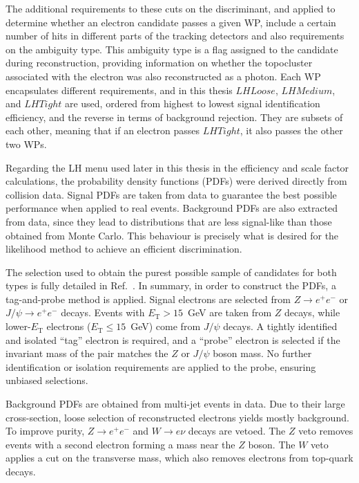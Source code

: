 The additional requirements to these cuts on the discriminant, and applied to determine whether an electron candidate passes a given WP, include a certain number of hits in different parts of the tracking detectors and also requirements on the ambiguity type. This ambiguity type is a flag assigned to the candidate during reconstruction, providing information on whether the topocluster associated with the electron was also reconstructed as a photon.
Each WP encapsulates different requirements, and in this thesis $LHLoose$, $LHMedium$, and $LHTight$ are used, ordered from highest to lowest signal identification efficiency, and the reverse in terms of background rejection. They are subsets of each other, meaning that if an electron passes $LHTight$, it also passes the other two WPs.

Regarding the LH menu used later in this thesis in the efficiency and scale factor calculations, the probability density functions (PDFs) were derived directly from collision data. Signal PDFs are taken from data to guarantee the best possible performance when applied to real events. Background PDFs are also extracted from data, since they lead to distributions that are less signal-like than those obtained from Monte Carlo. This behaviour is precisely what is desired for the likelihood method to achieve an efficient discrimination.

The selection used to obtain the purest possible sample of candidates for both types is fully detailed in Ref.~\cite{lucas_thesis}. In summary, in order to construct the PDFs, a tag-and-probe method is applied. Signal electrons are selected from $Z \rightarrow e^{+}e^{-}$ or $J/\psi \rightarrow e^{+}e^{-}$ decays. Events with $E_{\text{T}} > 15$~GeV are taken from $Z$ decays, while lower-$E_{\text{T}}$ electrons ($E_{\text{T}} \leq 15$~GeV) come from $J/\psi$ decays. A tightly identified and isolated “tag” electron is required, and a “probe” electron is selected if the invariant mass of the pair matches the $Z$ or $J/\psi$ boson mass. No further identification or isolation requirements are applied to the probe, ensuring unbiased selections.

Background PDFs are obtained from multi-jet events in data. Due to their large cross-section, loose selection of reconstructed electrons yields mostly background. To improve purity, $Z \rightarrow e^{+}e^{-}$ and $W \rightarrow e\nu$ decays are vetoed. The $Z$ veto removes events with a second electron forming a mass near the $Z$ boson. The $W$ veto applies a cut on the transverse mass, which also removes electrons from top-quark decays.


